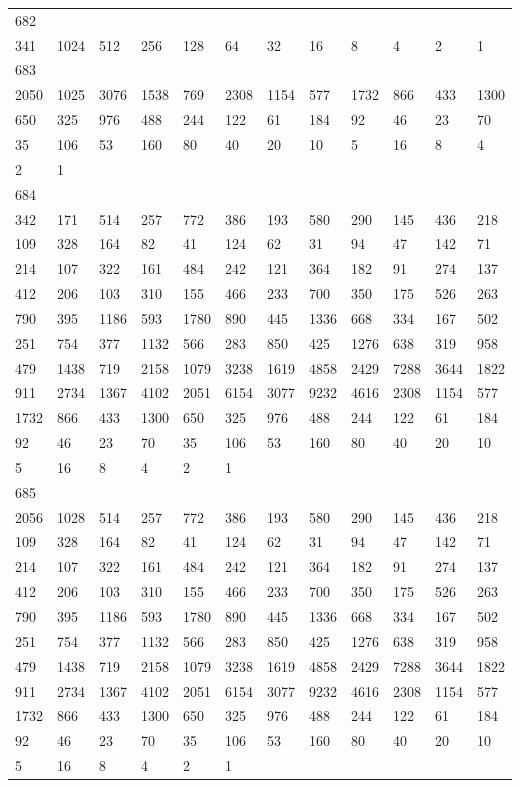 \begin{longtable}{llllllllllll}
682&&&&&&&&&&&\\
341& 1024& 512& 256& 128& 64& 32& 16& 8& 4& 2& 1\\

683&&&&&&&&&&&\\
2050& 1025& 3076& 1538& 769& 2308& 1154& 577& 1732& 866& 433& 1300\\
650& 325& 976& 488& 244& 122& 61& 184& 92& 46& 23& 70\\
35& 106& 53& 160& 80& 40& 20& 10& 5& 16& 8& 4\\
2& 1& \\

684&&&&&&&&&&&\\
342& 171& 514& 257& 772& 386& 193& 580& 290& 145& 436& 218\\
109& 328& 164& 82& 41& 124& 62& 31& 94& 47& 142& 71\\
214& 107& 322& 161& 484& 242& 121& 364& 182& 91& 274& 137\\
412& 206& 103& 310& 155& 466& 233& 700& 350& 175& 526& 263\\
790& 395& 1186& 593& 1780& 890& 445& 1336& 668& 334& 167& 502\\
251& 754& 377& 1132& 566& 283& 850& 425& 1276& 638& 319& 958\\
479& 1438& 719& 2158& 1079& 3238& 1619& 4858& 2429& 7288& 3644& 1822\\
911& 2734& 1367& 4102& 2051& 6154& 3077& 9232& 4616& 2308& 1154& 577\\
1732& 866& 433& 1300& 650& 325& 976& 488& 244& 122& 61& 184\\
92& 46& 23& 70& 35& 106& 53& 160& 80& 40& 20& 10\\
5& 16& 8& 4& 2& 1& \\

685&&&&&&&&&&&\\
2056& 1028& 514& 257& 772& 386& 193& 580& 290& 145& 436& 218\\
109& 328& 164& 82& 41& 124& 62& 31& 94& 47& 142& 71\\
214& 107& 322& 161& 484& 242& 121& 364& 182& 91& 274& 137\\
412& 206& 103& 310& 155& 466& 233& 700& 350& 175& 526& 263\\
790& 395& 1186& 593& 1780& 890& 445& 1336& 668& 334& 167& 502\\
251& 754& 377& 1132& 566& 283& 850& 425& 1276& 638& 319& 958\\
479& 1438& 719& 2158& 1079& 3238& 1619& 4858& 2429& 7288& 3644& 1822\\
911& 2734& 1367& 4102& 2051& 6154& 3077& 9232& 4616& 2308& 1154& 577\\
1732& 866& 433& 1300& 650& 325& 976& 488& 244& 122& 61& 184\\
92& 46& 23& 70& 35& 106& 53& 160& 80& 40& 20& 10\\
5& 16& 8& 4& 2& 1& \\


\end{longtable}
